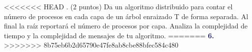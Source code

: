 <<<<<<< HEAD
. (2 puntos) Da un algoritmo distribuido para contar el número de procesos en cada capa de un árbol enraizado T de forma separada. Al final la raíz reportará el número de procesos por capa. Analiza la complejidad de tiempo y la complejidad de mensajes de tu algoritmo. 
=======
\newpage
\textbf{\textcolor{MidnightBlue}{6.}}
>>>>>>> 8b75eb6b2d65790e47fe8ab8cbe88bfec584c480
